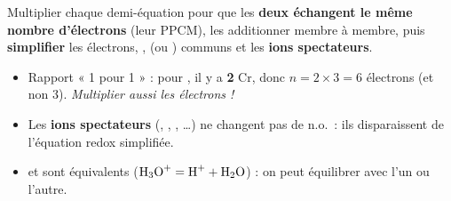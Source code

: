 \documentclass[11pt,a4paper]{article}
\begin{document}
\begin{methode}
Multiplier chaque demi-équation pour que les \textbf{deux échangent le même nombre d'électrons}
(leur PPCM), les additionner membre à membre, puis \textbf{simplifier} les électrons, ,
 (ou ) communs et les \textbf{ions spectateurs}.
\end{methode}

\begin{piege}
\begin{itemize}[leftmargin=1.5em,topsep=1pt,itemsep=1pt]
  \item Rapport « 1 pour 1 » : pour , il y a \textbf{2} Cr, donc
        $n=2\times 3=6$ électrons (et non 3). \emph{Multiplier aussi les électrons !}
  \item Les \textbf{ions spectateurs} (, , , \ldots) ne changent
        pas de n.o.\ : ils disparaissent de l'équation redox simplifiée.
  \item {} et  sont équivalents ($\ce{H3O+}=\ce{H+}+\ce{H2O}$) : on peut équilibrer
        avec l'un ou l'autre.
\end{itemize}
\end{piege}
\end{document}
